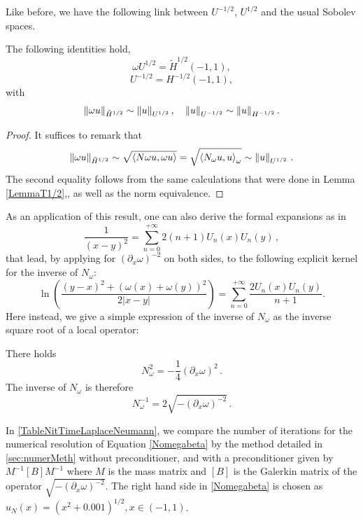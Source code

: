 \documentclass[a4paper]{article}
\begin{document}
	Like before, we have the following link between $U^{-1/2}$, $U^{1/2}$ and the usual Sobolev spaces. 
\begin{Lem} The following identities hold, 
	\[\omega U^{1/2} = \tilde{H}^{1/2}(-1,1),\]
	\[ U^{-1/2} = H^{-1/2}(-1,1),\]
	with 
	\[\left\|\omega u\right\|_{\tilde{H}^{1/2}} \sim \left\|u\right\|_{U^{1/2}},\quad \left\|u\right\|_{U^{-1/2}} \sim \left\|u\right\|_{H^{-1/2}}.\]
	\label{lemU12H12}
\end{Lem}
\begin{proof} It suffices to remark that 
	\[ \left\|\omega u\right\|_{\tilde{H}^{1/2}} \sim \sqrt{\left\langle N\omega u,\omega u\right\rangle} = \sqrt{\left\langle N_\omega u,u\right\rangle_\omega} \sim \left\|u\right\|_{U^{1/2}}\,.\]
	The second equality follows from the same calculations that were done in Lemma \ref{LemmaT1/2},, as well as the norm equivalence. 
\end{proof}
As an application of this result, one can also derive the formal expansions as in \cite{jerez2012explicit}
\[\frac{1}{(x-y)^2} = \sum_{n=0}^{+\infty} 2(n+1)U_n(x)U_n(y)\,,\]
that lead, by applying for $(\partial_x\omega)^{-2}$ on both sides, to the following explicit kernel for the inverse of $N_\omega$:
\[\ln\left(\dfrac{(y-x)^2 + (\omega(x) + \omega(y))^2}{2|x-y|}\right) = \sum_{n=0}^{+\infty} \dfrac{2 U_n(x) U_n(y)}{n+1}.\]
Here instead, we give a simple expression of the inverse of $N_\omega$ as the inverse square root of a local operator:
\begin{The} 
	\label{the:NeumannInverseLaplace}
	There holds 
	\[N_\omega^2 = -\frac{1}{4}(\partial_x \omega)^2 \,.\]
	The inverse of $N_\omega$ is therefore 
	\begin{equation}
	N_\omega^{-1} = 2\sqrt{-(\partial_x \omega)^{-2}}\,.
	\end{equation}
\end{The}
In \autoref{TableNitTimeLaplaceNeumann}, we compare the number of iterations for the numerical resolution of Equation \eqref{Nomegabeta} by the method detailed in \autoref{sec:numerMeth} without preconditioner, and with a preconditioner given by $M^{-1} \left[B \right] M^{-1}$ where $M$ is the mass matrix and $\left[ B \right]$ is the Galerkin matrix of the operator $\sqrt{ -( \partial_x \omega)^{-2}}$. The right hand side in \eqref{Nomegabeta} is chosen as $u_N(x) = (x^2 + 0.001)^{1/2}, x \in (-1,1)$.
\end{document}
